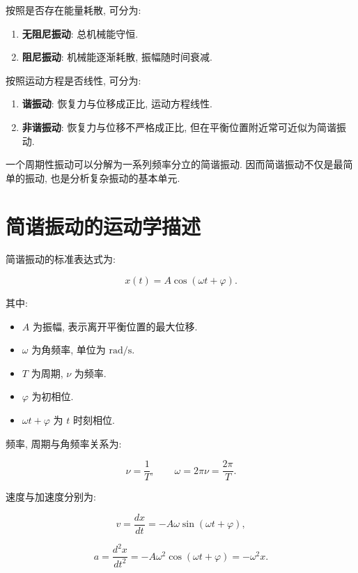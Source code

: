 \documentclass[
  a4paper,
]{ctexrep}
\providecommand{\tightlist}{%
  \setlength{\itemsep}{0pt}\setlength{\parskip}{0pt}}
\begin{document}
按照是否存在能量耗散, 可分为:

\begin{enumerate}
\def\labelenumi{\arabic{enumi}.}
\tightlist
\item
  \textbf{无阻尼振动}: 总机械能守恒.
\item
  \textbf{阻尼振动}: 机械能逐渐耗散, 振幅随时间衰减.
\end{enumerate}

按照运动方程是否线性, 可分为:

\begin{enumerate}
\def\labelenumi{\arabic{enumi}.}
\tightlist
\item
  \textbf{谐振动}: 恢复力与位移成正比, 运动方程线性.
\item
  \textbf{非谐振动}: 恢复力与位移不严格成正比,
  但在平衡位置附近常可近似为简谐振动.
\end{enumerate}

一个周期性振动可以分解为一系列频率分立的简谐振动.
因而简谐振动不仅是最简单的振动, 也是分析复杂振动的基本单元.

\section{简谐振动的运动学描述}\label{ux7b80ux8c10ux632fux52a8ux7684ux8fd0ux52a8ux5b66ux63cfux8ff0}

简谐振动的标准表达式为:

\[
x(t)=A\cos(\omega t+\varphi).
\]

其中:

\begin{itemize}
\tightlist
\item
  \(A\) 为振幅, 表示离开平衡位置的最大位移.
\item
  \(\omega\) 为角频率, 单位为 \(\mathrm{rad/s}\).
\item
  \(T\) 为周期, \(\nu\) 为频率.
\item
  \(\varphi\) 为初相位.
\item
  \(\omega t+\varphi\) 为 \(t\) 时刻相位.
\end{itemize}

频率, 周期与角频率关系为:

\[
\nu=\frac{1}{T},\qquad \omega=2\pi \nu=\frac{2\pi}{T}.
\]

速度与加速度分别为:

\[
v=\frac{dx}{dt}=-A\omega\sin(\omega t+\varphi),
\]

\[
a=\frac{d^2x}{dt^2}=-A\omega^2\cos(\omega t+\varphi)=-\omega^2x.
\]
\end{document}
